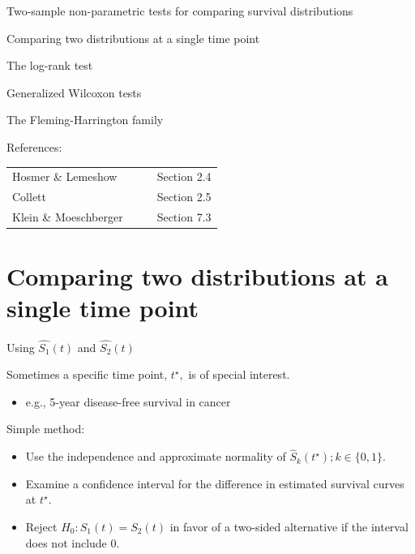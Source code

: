\documentclass[ignorenonframetext,]{beamer}
\providecommand{\tightlist}{%
  \setlength{\itemsep}{0pt}\setlength{\parskip}{0pt}}
\begin{document}
\begin{frame}{%
\protect\hypertarget{two-sample-non-parametric-tests-for-comparing-survival-distributions}{%
Two-sample non-parametric tests for comparing survival distributions}}

Comparing two distributions at a single time point

The log-rank test

Generalized Wilcoxon tests

The Fleming-Harrington family

\vspace{1cm}

\small

References:

\begin{tabular}{ll}
Hosmer \& Lemeshow &  Section 2.4\\
Collett & Section 2.5\\
Klein \& Moeschberger~~~~ & Section 7.3\\
\end{tabular}

\end{frame}

\hypertarget{comparing-two-distributions-at-a-single-time-point}{%
\section{Comparing two distributions at a single time
point}\label{comparing-two-distributions-at-a-single-time-point}}

\begin{frame}{%
\protect\hypertarget{using-widehats_1t-and-widehats_2t}{%
Using \(\widehat{S_1}(t)\) and \(\widehat{S_2}(t)\)}}

Sometimes a specific time point, \(t^{\star},\) is of special interest.

\begin{itemize}
\tightlist
\item
  e.g., 5-year disease-free survival in cancer
\end{itemize}

Simple method:

\begin{itemize}
\item
  Use the independence and approximate normality of
  \(\widehat S_k(t^\star); k \in\{ 0,1 \}\).
\item
  Examine a confidence interval for the difference in estimated survival
  curves at \(t^{\star}\).
\item
  Reject \(H_0: S_1(t) = S_2(t)\) in favor of a two-sided alternative if
  the interval does not include 0.
\end{itemize}

\end{frame}
\end{document}

